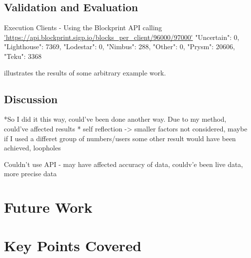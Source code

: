\subsection{Validation and Evaluation}


Execution Clients - Using the Blockprint API calling \url{'https://api.blockprint.sigp.io/blocks_per_client/96000/97000'}
{"Uncertain": 0, "Lighthouse": 7369, "Lodestar": 0, "Nimbus": 288, "Other": 0, "Prysm": 20606, "Teku": 3368}

 illustrates the results of some arbitrary example work.

\begin{table}[!htb]
    \centering
    \caption{A doubly colourful picture.}
  \label{Table:tabsubex}
\end{table}
\quad

\subsection{Discussion}
*So I did it this way, could've been done another way. Due to my method, could've affected results
* self reflection -> smaller factors not considered, maybe if I used a differet group of numbers/users some other result would have been achieved, loopholes


Couldn't use API - may have affected accuracy of data, couldv'e been live data, more precise data




\section{Future Work}
\section{Key Points Covered}
